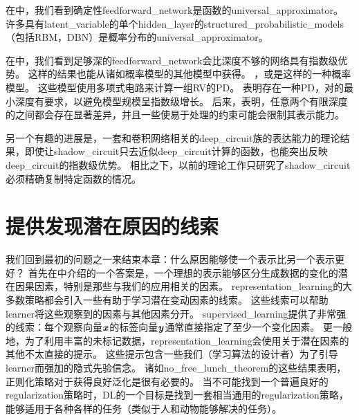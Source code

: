 
在中，我们看到确定性\gls{feedforward_network}是函数的\gls{universal_approximator}。
许多具有\gls{latent_variable}的单个\gls{hidden_layer}的\gls{structured_probabilistic_models}（包括\gls{RBM}，\gls{DBN}）是概率分布的\gls{universal_approximator}\citep{LeRoux-Bengio-2007-TR,Montufar-2011,Montufar-et-al-NIPS2014,Krause-et-al-ICML2013}。


在中，我们看到足够深的\gls{feedforward_network}会比深度不够的网络具有指数级优势。
这样的结果也能从诸如概率模型的其他模型中获得。
，或\citep{Poon+Domingos-2011}是这样的一种概率模型。
这些模型使用多项式电路来计算一组\gls{RV}的\gls{PD}。
\cite{Delalleau+Bengio-2011-small}表明存在一种\gls{PD}，对的最小深度有要求，以避免模型规模呈指数级增长。
后来，\cite{Martens+Medabalimi-arxiv2014}表明，任意两个有限深度的之间都会存在显著差异，并且一些使易于处理的约束可能会限制其表示能力。


另一个有趣的进展是，一套和卷积网络相关的\gls{deep_circuit}族的表达能力的理论结果，即使让\gls{shadow_circuit}只去近似\gls{deep_circuit}计算的函数，也能突出反映\gls{deep_circuit}的指数级优势\citep{Cohen-et-al-arXiv2015}。
相比之下，以前的理论工作只研究了\gls{shadow_circuit}必须精确复制特定函数的情况。


\section{提供发现潜在原因的线索}
\label{sec:providing_clues_to_discover_underlying_causes}
我们回到最初的问题之一来结束本章：什么原因能够使一个表示比另一个表示更好？
首先在中介绍的一个答案是，一个理想的表示能够区分生成数据的变化的潜在因果因素，特别是那些与我们的应用相关的因素。
\gls{representation_learning}的大多数策略都会引入一些有助于学习潜在变动因素的线索。
这些线索可以帮助\gls{learner}将这些观察到的因素与其他因素分开。
\gls{supervised_learning}提供了非常强的线索：每个观察向量$\boldsymbol{\mathit{x}}$的标签向量$\boldsymbol{\mathit{y}}$通常直接指定了至少一个变化因素。
更一般地，为了利用丰富的未标记数据，\gls{representation_learning}会使用关于潜在因素的其他不太直接的提示。
这些提示包含一些我们（学习算法的设计者）为了引导\gls{learner}而强加的隐式先验信念。
诸如\gls{no_free_lunch_theorem}的这些结果表明，正则化策略对于获得良好泛化是很有必要的。
当不可能找到一个普遍良好的\gls{regularization}策略时，\gls{DL}的一个目标是找到一套相当通用的\gls{regularization}策略，能够适用于各种各样的任务（类似于人和动物能够解决的任务）。

